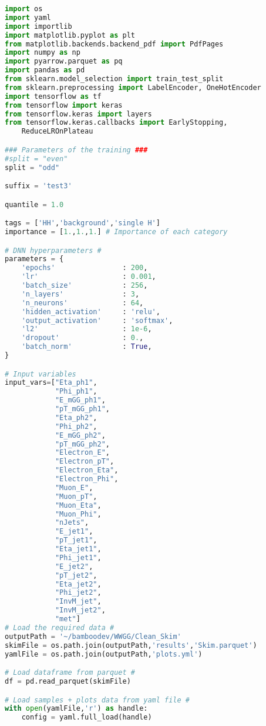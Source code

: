 \begin{lstlisting}[language=Python, caption=DNN setup for the \wwgg semi-leptonic final state, label={dnncode}]
import os
import yaml
import importlib
import matplotlib.pyplot as plt
from matplotlib.backends.backend_pdf import PdfPages
import numpy as np
import pyarrow.parquet as pq
import pandas as pd
from sklearn.model_selection import train_test_split
from sklearn.preprocessing import LabelEncoder, OneHotEncoder 
import tensorflow as tf
from tensorflow import keras
from tensorflow.keras import layers
from tensorflow.keras.callbacks import EarlyStopping,
    ReduceLROnPlateau

### Parameters of the training ###
#split = "even" 
split = "odd" 

suffix = 'test3'

quantile = 1.0

tags = ['HH','background','single H']
importance = [1.,1.,1.] # Importance of each category

# DNN hyperparameters #
parameters = {
    'epochs'                : 200,
    'lr'                    : 0.001,
    'batch_size'            : 256,
    'n_layers'              : 3,
    'n_neurons'             : 64,
    'hidden_activation'     : 'relu',
    'output_activation'     : 'softmax',
    'l2'                    : 1e-6,
    'dropout'               : 0.,
    'batch_norm'            : True,
}

# Input variables
input_vars=["Eta_ph1",
            "Phi_ph1",
            "E_mGG_ph1",
            "pT_mGG_ph1",
            "Eta_ph2",
            "Phi_ph2",
            "E_mGG_ph2",
            "pT_mGG_ph2",
            "Electron_E",
            "Electron_pT",
            "Electron_Eta",
            "Electron_Phi",
            "Muon_E",
            "Muon_pT",
            "Muon_Eta",
            "Muon_Phi",
            "nJets",
            "E_jet1",
            "pT_jet1",
            "Eta_jet1",
            "Phi_jet1",
            "E_jet2",
            "pT_jet2",
            "Eta_jet2",
            "Phi_jet2",
            "InvM_jet",
            "InvM_jet2",
            "met"]
# Load the required data #
outputPath = '~/bamboodev/WWGG/Clean_Skim'
skimFile = os.path.join(outputPath,'results','Skim.parquet')
yamlFile = os.path.join(outputPath,'plots.yml')

# Load dataframe from parquet #
df = pd.read_parquet(skimFile)

# Load samples + plots data from yaml file #
with open(yamlFile,'r') as handle:
    config = yaml.full_load(handle)


\end{lstlisting}
